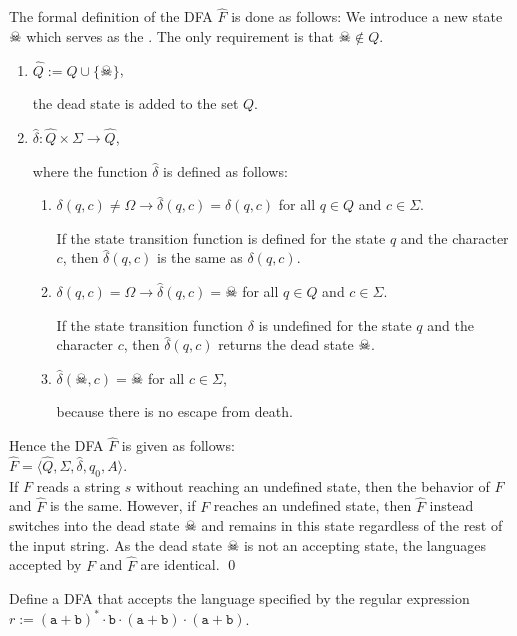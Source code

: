 The formal definition of the \textsc{DFA} $\widehat{F}$ is done as follows:
We introduce a new state $\skull$ which serves as the .  The only requirement is that $\skull \not\in Q$.
\begin{enumerate}
\item $\widehat{Q} := Q \cup \{ \skull \}$,

      the dead state is added to the set  $Q$.
\item $\widehat{\delta} : \widehat{Q} \times \Sigma \rightarrow \widehat{Q}$,

      where the function $\widehat{\delta}$ is defined as follows:
      \begin{enumerate}
      \item $\delta(q,c) \not= \Omega \rightarrow \widehat{\delta}(q,c) = \delta(q,c)$ \quad  for all $q \in Q$ and $c \in \Sigma$.

            If the state transition function is defined for the state  $q$ and the character
            $c$, then $\widehat{\delta}(q,c)$ is the same as $\delta(q,c)$.
      \item $\delta(q,c) = \Omega \rightarrow \widehat{\delta}(q,c) = \skull$  \quad for all $q \in Q$ and $c \in \Sigma$.

            If the state transition function $\delta$ is undefined for the state $q$ and the character
            $c$, then $\widehat{\delta}(q,c)$ returns the dead state $\skull$.
      \item $\widehat{\delta}(\skull, c) = \skull$ \quad for all $c \in \Sigma$,

            because there is no escape from death.
      \end{enumerate}
\end{enumerate}
Hence the \textsc{DFA}  $\widehat{F}$ is given as follows:
\\[0.2cm]
\hspace*{1.3cm}
$\widehat{F} = \langle \widehat{Q}, \Sigma, \widehat{\delta}, q_0, A \rangle$.
\\[0.2cm]
If  $F$ reads a string $s$ without reaching an undefined state, then the behavior of $F$ and $\widehat{F}$ is the same.
However, if $F$ reaches an undefined state, then $\widehat{F}$ instead switches into the dead state 
$\skull$ and remains in this state regardless of the rest of the input string.  As the dead state $\skull$
is not an accepting state, the languages accepted by  $F$ and $\widehat{F}$ are identical. \qed 

\exerciseEng
Define a \textsc{DFA} that accepts the language specified by the regular expression 
\\[0.2cm]
\hspace*{1.3cm}
$r := (\texttt{a}+\texttt{b})^* \cdot \texttt{b} \cdot (\texttt{a}+\texttt{b}) \cdot
(\texttt{a}+\texttt{b})$. \eox

